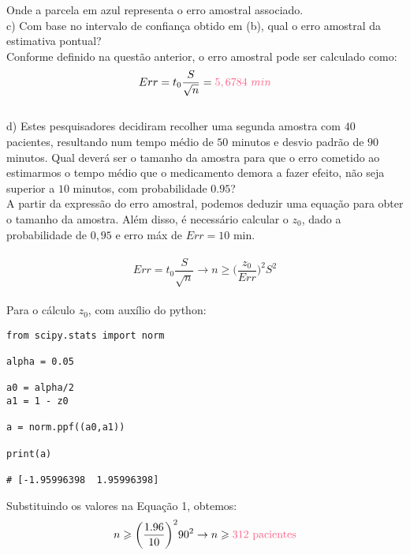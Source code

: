 Onde a parcela em \textcolor{deepblue}{azul} representa o erro amostral associado.\\

c) Com base no intervalo de confiança obtido em (b), qual o erro amostral da estimativa pontual?\\

Conforme definido na questão anterior, o erro amostral pode ser calculado como:\\

\[
    Err = t_0\frac{S}{\sqrt{n}} = \textcolor{COLOR2}{5,6784\ min}
\]
\\

d) Estes pesquisadores decidiram recolher uma segunda amostra com $40$ pacientes, resultando num tempo médio de $50$ minutos e desvio padrão de $90$ minutos. Qual deverá ser o tamanho da amostra para que o erro cometido ao estimarmos o tempo médio que o medicamento demora a fazer efeito, não seja superior a $10$ minutos, com probabilidade $0.95$?\\

A partir da expressão do erro amostral, podemos deduzir uma equação para obter o tamanho da amostra. Além disso, é necessário calcular o $z_0$, dado a probabilidade de $0,95$ e erro máx de $Err=10$ min.\\
\\

\begin{equation}
    Err = t_0\frac{S}{\sqrt{n}} \to n\geqslant \biggl(\frac{z_0}{Err}\biggr)^2 S^2
\end{equation}
\\

Para o cálculo $z_0$, com auxílio do python:\\

\begin{lstlisting}
from scipy.stats import norm
    
alpha = 0.05
            
a0 = alpha/2
a1 = 1 - z0
    
a = norm.ppf((a0,a1))
            
print(a)
    
# [-1.95996398  1.95996398]
\end{lstlisting}

Substituindo os valores na Equação 1, obtemos:\\

\[
    n\geqslant \biggl(\frac{1.96}{10}\biggr)^290^2 \to n \geqslant \textcolor{COLOR2}{312\ \text{pacientes}}
\]
\\

